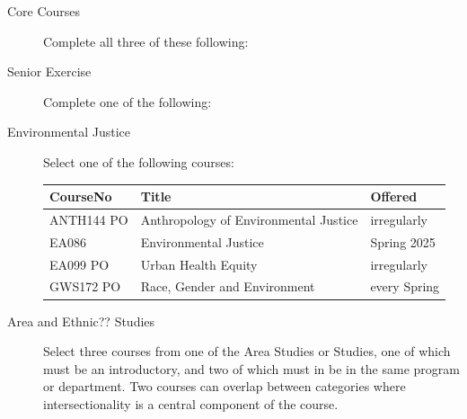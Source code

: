 \documentclass{article}\usepackage[]{graphicx}\usepackage[]{xcolor}
\newenvironment{itemize*}%
  {\begin{itemize}%
    \setlength{\itemsep}{0pt}%
    \setlength{\parskip}{0pt}}%
  {\end{itemize}}
\begin{document}
\begin{description}
  
 \item[Core Courses] Complete all three of these following:
  

  \item[Senior Exercise] Complete one of the following:
  


  \item[Environmental Justice] Select one of the following courses:
  
\begin{table}[ht]
\centering
\begin{tabular}{lll}
  \hline
CourseNo & Title & Offered \\ 
  \hline
ANTH144 PO & Anthropology of Environmental Justice & irregularly \\ 
  EA086 & Environmental Justice & Spring 2025 \\ 
  EA099 PO & Urban Health Equity & irregularly \\ 
  GWS172 PO & Race, Gender and Environment & every Spring \\ 
   \hline
\end{tabular}
\end{table}


  \item[Area and Ethnic?? Studies] Select three courses from one of the Area Studies or Studies, one of which must be an introductory, and two of which must in be in the same program or department. Two courses can overlap between categories where intersectionality is a central component of the course.
  

\end{description}
\end{document}
